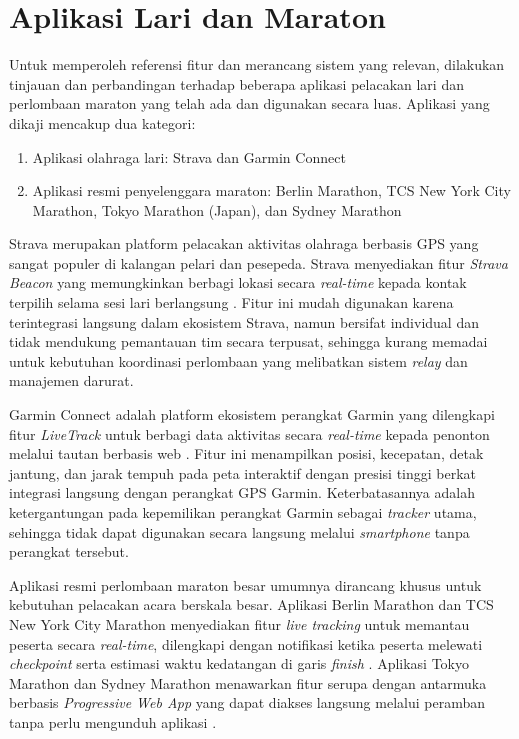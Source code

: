  
\section{Aplikasi Lari dan Maraton}
\label{sec:benchmarking-aplikasi}

Untuk memperoleh referensi fitur dan merancang sistem yang relevan, dilakukan tinjauan dan perbandingan terhadap beberapa aplikasi pelacakan lari dan perlombaan maraton yang telah ada dan digunakan secara luas. Aplikasi yang dikaji mencakup dua kategori: 
\begin{enumerate}
    \item Aplikasi olahraga lari: Strava dan Garmin Connect
    \item Aplikasi resmi penyelenggara maraton: Berlin Marathon, TCS New York City Marathon, Tokyo Marathon (Japan), dan Sydney Marathon
\end{enumerate}
Strava merupakan platform pelacakan aktivitas olahraga berbasis GPS yang sangat populer di kalangan pelari dan pesepeda. Strava menyediakan fitur \textit{Strava Beacon} yang memungkinkan berbagi lokasi secara \textit{real-time} kepada kontak terpilih selama sesi lari berlangsung \cite{strava2024beacon}. Fitur ini mudah digunakan karena terintegrasi langsung dalam ekosistem Strava, namun bersifat individual dan tidak mendukung pemantauan tim secara terpusat, sehingga kurang memadai untuk kebutuhan koordinasi perlombaan yang melibatkan sistem \textit{relay} dan manajemen darurat.

Garmin Connect adalah platform ekosistem perangkat Garmin yang dilengkapi fitur \textit{LiveTrack} untuk berbagi data aktivitas secara \textit{real-time} kepada penonton melalui tautan berbasis web \cite{garmin2024livetrack}. Fitur ini menampilkan posisi, kecepatan, detak jantung, dan jarak tempuh pada peta interaktif dengan presisi tinggi berkat integrasi langsung dengan perangkat GPS Garmin. Keterbatasannya adalah ketergantungan pada kepemilikan perangkat Garmin sebagai \textit{tracker} utama, sehingga tidak dapat digunakan secara langsung melalui \textit{smartphone} tanpa perangkat tersebut.

Aplikasi resmi perlombaan maraton besar umumnya dirancang khusus untuk kebutuhan pelacakan acara berskala besar. Aplikasi Berlin Marathon dan TCS New York City Marathon menyediakan fitur \textit{live tracking} untuk memantau peserta secara \textit{real-time}, dilengkapi dengan notifikasi ketika peserta melewati \textit{checkpoint} serta estimasi waktu kedatangan di garis \textit{finish} \cite{nycmarathon2024app, berlinmarathon2024app}. Aplikasi Tokyo Marathon dan Sydney Marathon menawarkan fitur serupa dengan antarmuka berbasis \textit{Progressive Web App} yang dapat diakses langsung melalui peramban tanpa perlu mengunduh aplikasi \cite{tokyomarathon2024app, sydneymarathon2024app}.


